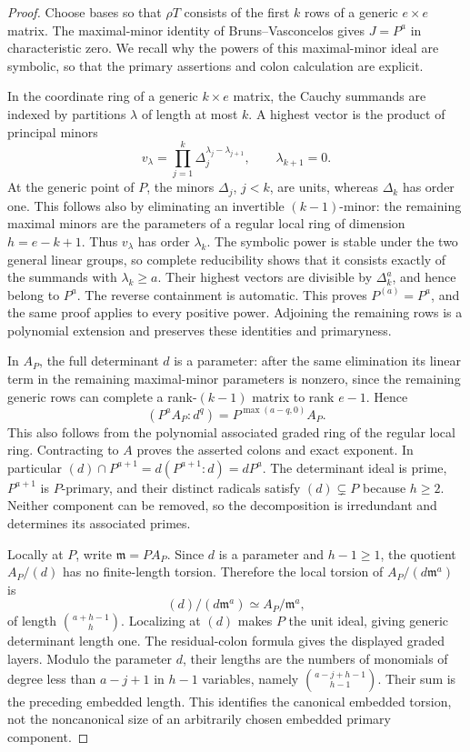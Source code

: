 \begin{proof}
Choose bases so that \(\rho T\) consists of the first \(k\) rows
of a generic \(e\times e\) matrix.  The maximal-minor identity of
Bruns--Vasconcelos gives \(J=P^a\) in characteristic zero.  We recall
why the powers of this maximal-minor ideal are symbolic, so that the
primary assertions and colon calculation are explicit.

In the coordinate ring of a generic \(k\times e\) matrix, the Cauchy
summands are indexed by partitions \(\lambda\) of length at most
\(k\).  A highest vector is the product of principal minors
\[
 v_\lambda=\prod_{j=1}^k\Delta_j^{\lambda_j-\lambda_{j+1}},
 \qquad \lambda_{k+1}=0.
\]
At the generic point of \(P\), the minors \(\Delta_j\), \(j<k\),
are units, whereas \(\Delta_k\) has order one.  This follows also
by eliminating an invertible \((k-1)\)-minor: the remaining maximal
minors are the parameters of a regular local ring of dimension
\(h=e-k+1\).  Thus \(v_\lambda\) has order \(\lambda_k\).
The symbolic power is stable under the two general linear groups, so
complete reducibility shows that it consists exactly of the summands
with \(\lambda_k\ge a\).  Their highest vectors are divisible by
\(\Delta_k^a\), and hence belong to \(P^a\).  The reverse
containment is automatic.  This proves \(P^{(a)}=P^a\), and the
same proof applies to every positive power.  Adjoining the remaining
rows is a polynomial extension and preserves these identities and
primaryness.

In \(A_P\), the full determinant \(d\) is a parameter: after the
same elimination its linear term in the remaining maximal-minor
parameters is nonzero, since the remaining generic rows can complete
a rank-\((k-1)\) matrix to rank \(e-1\).  Hence
\[
 (P^aA_P:d^q)=P^{\max(a-q,0)}A_P.
\]
This also follows from the polynomial associated graded ring of the
regular local ring.  Contracting to \(A\) proves the asserted colons
and exact exponent.  In particular
\((d)\cap P^{a+1}=d(P^{a+1}:d)=dP^a\).
The determinant ideal is prime, \(P^{a+1}\) is \(P\)-primary,
and their distinct radicals satisfy \((d)\subsetneq P\) because
\(h\ge2\).  Neither component can be removed, so the decomposition
is irredundant and determines its associated primes.

Locally at \(P\), write \(\mathfrak m=PA_P\).  Since \(d\) is a
parameter and \(h-1\ge1\), the quotient \(A_P/(d)\) has no
finite-length torsion.  Therefore the local torsion of
\(A_P/(d\mathfrak m^a)\) is
\[
 (d)/(d\mathfrak m^a)\simeq A_P/\mathfrak m^a,
\]
of length \(\binom{a+h-1}{h}\).  Localizing at \((d)\) makes
\(P\) the unit ideal, giving generic determinant length one.
The residual-colon formula gives the displayed graded layers.
Modulo the parameter \(d\), their lengths are the numbers of
monomials of degree less than \(a-j+1\) in \(h-1\) variables,
namely \(\binom{a-j+h-1}{h-1}\).  Their sum is the preceding
embedded length.  This identifies the canonical embedded torsion,
not the noncanonical size of an arbitrarily chosen embedded primary
component.
\end{proof}
